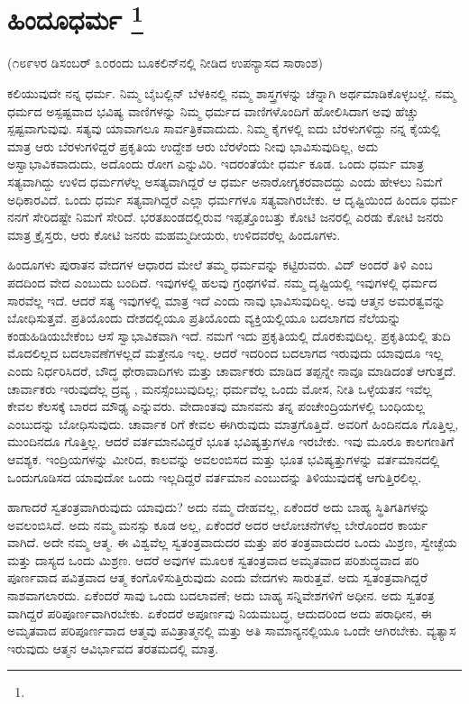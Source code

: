 
\chapter[ಹಿಂದೂಧರ್ಮ ]{ಹಿಂದೂಧರ್ಮ \protect\footnote{}}

\centerline{(೧೮೯೪ರ ಡಿಸಂಬರ್​ ೩೦ರಂದು ಬೂಕಲಿನ್​ನಲ್ಲಿ ನೀಡಿದ ಉಪನ್ಯಾಸದ ಸಾರಾಂಶ)}

ಕಲಿಯುವುದೇ ನನ್ನ ಧರ್ಮ. ನಿಮ್ಮ ಬೈಬಲ್ಲಿನ್ ಬೆಳಕಿನಲ್ಲಿ ನಮ್ಮ ಶಾಸ್ತ್ರಗಳನ್ನು ಚೆನ್ನಾಗಿ ಅರ್ಥಮಾಡಿಕೊಳ್ಳಬಲ್ಲೆ. ನಮ್ಮ ಧರ್ಮದ ಅಸ್ಪಷ್ಟವಾದ ಭವಿಷ್ಯ ವಾಣಿಗಳನ್ನು ನಿಮ್ಮ ಧರ್ಮದ ವಾಣಿಗಳೊಂದಿಗೆ ಹೋಲಿಸಿದಾಗ ಅವು ಹೆಚ್ಚು ಸ್ಪಷ್ಟವಾಗುವುವು. ಸತ್ಯವು ಯಾವಾಗಲೂ ಸಾರ್ವತ್ರಿಕವಾದುದು. ನಿಮ್ಮ ಕೈಗಳಲ್ಲಿ ಐದು ಬೆರಳುಗಳಿದ್ದು ನನ್ನ ಕೈಯಲ್ಲಿ ಮಾತ್ರ ಆರು ಬೆರಳುಗಳಿದ್ದರೆ ಪ್ರಕೃತಿಯ ಉದ್ದೇಶ ಆರು ಬೆರಳೆಂದು ನೀವು ಭಾವಿಸುವುದಿಲ್ಲ, ಅದು ಅಸ್ವಾಭಾವಿಕವಾದುದು, ಅದೊಂದು ರೋಗ ಎನ್ನುವಿರಿ. ಇದರಂತೆಯೇ ಧರ್ಮ ಕೂಡ. ಒಂದು ಧರ್ಮ ಮಾತ್ರ ಸತ್ಯವಾಗಿದ್ದು ಉಳಿದ ಧರ್ಮಗಳೆಲ್ಲ ಅಸತ್ಯವಾಗಿದ್ದರೆ ಆ ಧರ್ಮ ಅನಾರೋಗ್ಯಕರವಾದದ್ದು ಎಂದು ಹೇಳಲು ನಿಮಗೆ ಅಧಿಕಾರವಿದೆ. ಒಂದು ಧರ್ಮ ಸತ್ಯವಾಗಿದ್ದರೆ ಎಲ್ಲಾ ಧರ್ಮಗಳೂ ಸತ್ಯವಾಗಿರಬೇಕು. ಆ ದೃಷ್ಟಿಯಿಂದ ಹಿಂದೂ ಧರ್ಮ ನನಗೆ ಸೇರಿದಷ್ಟೇ ನಿಮಗೆ ಸೇರಿದೆ. ಭರತಖಂಡದಲ್ಲಿರುವ ಇಪ್ಪತ್ತೊಂಬತ್ತು ಕೋಟಿ ಜನರಲ್ಲಿ ಎರಡು ಕೋಟಿ ಜನರು ಮಾತ್ರ ಕ್ರೈಸ್ತರು, ಆರು ಕೋಟಿ ಜನರು ಮಹಮ್ಮದೀಯರು, ಉಳಿದವರೆಲ್ಲ ಹಿಂದೂಗಳು.

ಹಿಂದೂಗಳು ಪುರಾತನ ವೇದಗಳ ಆಧಾರದ ಮೇಲೆ ತಮ್ಮ ಧರ್ಮವನ್ನು ಕಟ್ಟಿರುವರು. ವಿದ್​ ಅಂದರೆ ತಿಳಿ ಎಂಬ ಪದದಿಂದ ವೇದ ಎಂಬುದು ಬಂದಿದೆ. ಇವುಗಳಲ್ಲಿ ಹಲವು ಗ್ರಂಥಗಳಿವೆ. ನಮ್ಮ ದೃಷ್ಟಿಯಲ್ಲಿ ಇವುಗಳಲ್ಲಿ ಧರ್ಮದ ಸಾರವೆಲ್ಲ ಇದೆ. ಆದರೆ ಸತ್ಯ ಇವುಗಳಲ್ಲಿ ಮಾತ್ರ ಇದೆ ಎಂದು ನಾವು ಭಾವಿಸುವುದಿಲ್ಲ. ಅವು ಆತ್ಮನ ಅಮರತ್ವವನ್ನು ಬೋಧಿಸುತ್ತವೆ. ಪ್ರತಿಯೊಂದು ದೇಶದಲ್ಲಿಯೂ ಪ್ರತಿಯೊಂದು ವ್ಯಕ್ತಿಯಲ್ಲಿಯೂ ಬದಲಾಗದ ನೆಲೆಯನ್ನು ಕಂಡುಹಿಡಿಯಬೇಕೆಂಬ ಆಸೆ ಸ್ವಾಭಾವಿಕವಾಗಿ ಇದೆ. ನಮಗೆ ಇದು ಪ್ರಕೃತಿಯಲ್ಲಿ ದೊರಕುವುದಿಲ್ಲ. ಪ್ರಕೃತಿಯಲ್ಲಿ ತುದಿ ಮೊದಲಿಲ್ಲದ ಬದಲಾವಣೆಗಳಲ್ಲದೆ ಮತ್ತೇನೂ ಇಲ್ಲ. ಆದರೆ ಇದರಿಂದ ಬದಲಾಗದ ಇರುವುದು ಯಾವುದೂ ಇಲ್ಲ ಎಂದು ನಿರ್ಧರಿಸಿದರೆ, ಬೌದ್ಧ ಥೇರಾವಾದಿಗಳು ಮತ್ತು ಚಾರ್ವಾಕರು ಮಾಡಿದ ತಪ್ಪನ್ನೇ ನಾವೂ ಮಾಡಿದಂತೆ ಆಗುತ್ತದೆ. ಚಾರ್ವಾಕರು ಇರುವುದೆಲ್ಲ ದ್ರವ್ಯ , ಮನಸ್ಸೆಂಬುವುದಿಲ್ಲ; ಧರ್ಮವೆಲ್ಲ ಒಂದು ಮೋಸ, ನೀತಿ ಒಳ್ಳೆಯತನ ಇವೆಲ್ಲ ಕೇವಲ ಕೆಲಸಕ್ಕೆ ಬಾರದ ಮೌಢ್ಯ ಎನ್ನುವರು. ವೇದಾಂತವು ಮಾನವನು ತನ್ನ ಪಂಚೇಂದ್ರಿಯಗಳಲ್ಲಿ ಬಂಧಿಯಲ್ಲ ಎಂಬುದನ್ನು ಬೋಧಿಸುವುದು. ಚಾರ್ವಾಕ ರಿಗೆ ಕೇವಲ ಈಗಿರುವುದು ಮಾತ್ರಗೊತ್ತಿದೆ. ಅವರಿಗೆ ಹಿಂದಿನದೂ ಗೊತ್ತಿಲ್ಲ, ಮುಂದಿನದೂ ಗೊತ್ತಿಲ್ಲ. ಆದರೆ ವರ್ತಮಾನವಿದ್ದರೆ ಭೂತ ಭವಿಷ್ಯತ್ತುಗಳೂ ಇರಬೇಕು. ಇವು ಮೂರೂ ಕಾಲಗಣತಿಗೆ ಆವಶ್ಯಕ. ಇಂದ್ರಿಯಗಳನ್ನು ಮೀರಿದ, ಕಾಲವನ್ನು ಅವಲಂಬಿಸದ ಮತ್ತು ಭೂತ ಭವಿಷ್ಯತ್ತುಗಳನ್ನು ವರ್ತಮಾನದಲ್ಲಿ ಒಂದುಗೂಡಿಸದ ಯಾವುದೋ ಒಂದು ಇಲ್ಲದಿದ್ದರೆ ವರ್ತಮಾನ ಎಂಬುದನ್ನು ತಿಳಿಯುವುದಕ್ಕೆ ಆಗುತ್ತಿರಲಿಲ್ಲ.

ಹಾಗಾದರೆ ಸ್ವತಂತ್ರವಾಗಿರುವುದು ಯಾವುದು? ಅದು ನಮ್ಮ ದೇಹವಲ್ಲ, ಏಕೆಂದರೆ ಅದು ಬಾಹ್ಯ ಸ್ಥಿತಿಗತಿಗಳನ್ನು ಅವಲಂಬಿಸಿದೆ. ಅದು ನಮ್ಮ ಮನಸ್ಸು ಕೂಡ ಅಲ್ಲ, ಏಕೆಂದರೆ ಅದರ ಆಲೋಚನೆಗಳೆಲ್ಲ ಬೇರೊಂದರ ಕಾರ್ಯ ವಾಗಿದೆ. ಅದೇ ನಮ್ಮ ಆತ್ಮ. ಈ ವಿಶ್ವವೆಲ್ಲ ಸ್ವತಂತ್ರವಾದುದರ ಮತ್ತು ಪರ ತಂತ್ರವಾದುದರ ಒಂದು ಮಿಶ್ರಣ, ಸ್ವೇಚ್ಛೆಯ ಮತ್ತು ದಾಸ್ಯದ ಒಂದು ಮಿಶ್ರಣ. ಆದರೆ ಅವುಗಳ ಮೂಲಕ ಸ್ವತಂತ್ರವಾದ ಅಮೃತವಾದ ಪರಿಶುದ್ಧವಾದ ಪರಿ ಪೂರ್ಣವಾದ ಪವಿತ್ರವಾದ ಆತ್ಮ ಕಂಗೊಳಿಸುತ್ತಿರುವುದು ಎಂದು ವೇದಗಳು ಸಾರುತ್ತವೆ. ಅದು ಸ್ವತಂತ್ರವಾಗಿದ್ದರೆ ನಾಶವಾಗಲಾರದು. ಏಕೆಂದರೆ ಸಾವು ಒಂದು ಬದಲಾವಣೆ; ಅದು ಬಾಹ್ಯ ಸನ್ನಿವೇಶಗಳಿಗೆ ಅಧೀನ. ಅದು ಸ್ವತಂತ್ರ ವಾಗಿದ್ದರೆ ಪರಿಪೂರ್ಣವಾಗಿರಬೇಕು. ಏಕೆಂದರೆ ಅಪೂರ್ಣವು ನಿಯಮಬದ್ಧ, ಆದುದರಿಂದ ಅದು ಪರಾಧೀನ, ಈ ಅಮೃತವಾದ ಪರಿಪೂರ್ಣವಾದ ಆತ್ಮವು ಪವಿತ್ರಾತ್ಮನಲ್ಲಿ ಮತ್ತು ಅತಿ ಸಾಮಾನ್ಯನಲ್ಲಿಯೂ ಒಂದೇ ಆಗಿರಬೇಕು. ವ್ಯತ್ಯಾಸ ಇರುವುದು ಆತ್ಮನ ಆವಿರ್ಭಾವದ ತರತಮದಲ್ಲಿ ಮಾತ್ರ.

